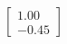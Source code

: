 \documentclass[preview]{standalone}
\begin{document}
\begin{align*}
\begin{bmatrix} 1.00 \\ -0.45 \end{bmatrix}
\end{align*}
\end{document}
